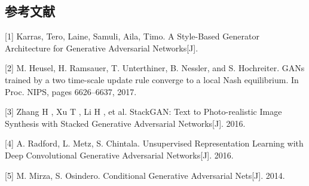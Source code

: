 \documentclass{article}
\begin{document}
\begin{CJK*}{UTF8}{gbsn}
\section*{参考文献}

\small

[1] Karras, Tero, Laine, Samuli, Aila, Timo. A Style-Based Generator Architecture for Generative Adversarial Networks[J].

[2] M. Heusel, H. Ramsauer, T. Unterthiner, B. Nessler, and S. Hochreiter. GANs trained by a two time-scale update rule converge to a local Nash equilibrium. In Proc. NIPS, pages 6626–6637, 2017.

[3] Zhang H , Xu T , Li H , et al. StackGAN: Text to Photo-realistic Image Synthesis with Stacked Generative Adversarial Networks[J]. 2016.

[4] A. Radford, L. Metz, S. Chintala. Unsupervised Representation Learning with Deep Convolutional Generative Adversarial Networks[J]. 2016.

[5] M. Mirza, S. Osindero. Conditional Generative Adversarial Nets[J]. 2014.

\end{CJK*}
\end{document}
